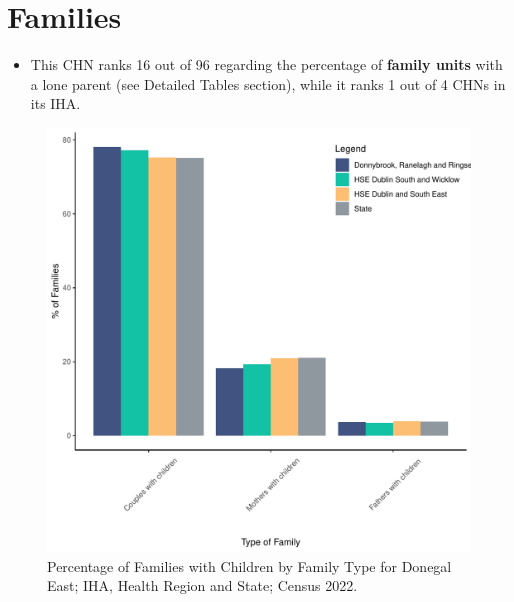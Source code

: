 \documentclass{article}
\begin{document}
\section{Families}\label{sect:Fam}
\begin{itemize}
\item This CHN ranks  16 out of 96 regarding the percentage of \textbf{family units} with a lone parent (see Detailed Tables section), while it ranks   1 out of 4 CHNs in its IHA.
\end{itemize}
\begin{figure}[H]
	\centering
	\includegraphics[width = 150mm]{../figures/FamED.pdf}
	\caption{Percentage of Families with Children by Family Type for Donegal East; IHA, Health Region and State; Census 2022.}
	\label{fig:vbnv}
	\end{figure}
	
\end{document}
